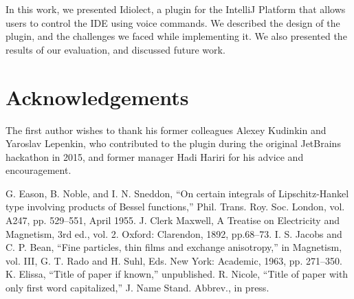 \documentclass[conference]{IEEEtran}
\begin{document}
In this work, we presented Idiolect, a plugin for the IntelliJ Platform that allows users to control the IDE using voice commands. We described the design of the plugin, and the challenges we faced while implementing it. We also presented the results of our evaluation, and discussed future work.

\section{Acknowledgements}

The first author wishes to thank his former colleagues Alexey Kudinkin and Yaroslav Lepenkin, who contributed to the plugin during the original JetBrains hackathon in 2015, and former manager Hadi Hariri for his advice and encouragement.

\begin{thebibliography}{00}
 G. Eason, B. Noble, and I. N. Sneddon, ``On certain integrals of Lipschitz-Hankel type involving products of Bessel functions,'' Phil. Trans. Roy. Soc. London, vol. A247, pp. 529--551, April 1955.
 J. Clerk Maxwell, A Treatise on Electricity and Magnetism, 3rd ed., vol. 2. Oxford: Clarendon, 1892, pp.68--73.
 I. S. Jacobs and C. P. Bean, ``Fine particles, thin films and exchange anisotropy,'' in Magnetism, vol. III, G. T. Rado and H. Suhl, Eds. New York: Academic, 1963, pp. 271--350.
 K. Elissa, ``Title of paper if known,'' unpublished.
 R. Nicole, ``Title of paper with only first word capitalized,'' J. Name Stand. Abbrev., in press.
\end{thebibliography}
\end{document}
